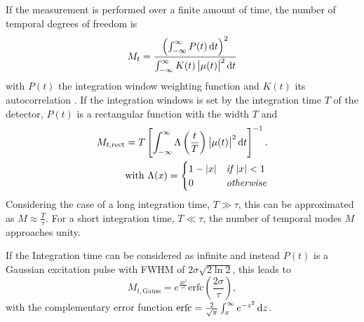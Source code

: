 If the measurement is performed over a finite amount of time, the number of temporal degrees of freedom is
\begin{equation}
M_t=\frac{\left(\int_{-\infty}^{\infty} P(t)\operatorname{\mathrm{d}\!} t\right)^2}{\int_{-\infty}^{\infty} K(t) \left|\mu(t)\right|^2\operatorname{\mathrm{d}\!} t}
\label{eq:modes}
\end{equation}
with $P(t)$ the integration window weighting function and $K(t)$ its autocorrelation \cite{goodman2007}. If the integration windows is set by the integration time $T$ of the detector, $P(t)$ is a rectangular function with the width $T$ and
\begin{align}
M_{t,\text{rect}} =T \left[\int_{-\infty}^{\infty} \Lambda\left(\frac{t}{T}\right) \left|\mu(t)\right|^2 \operatorname{\mathrm{d}\!} t \right]^{-1} .\\
\text{with  }\Lambda(x) = \begin{cases} 
 1-\left|x\right|& \textit{if }|x|<1\\
0 & \textit{otherwise}\\ 
\end{cases}
\label{eq:modesapprox}
\end{align}
Considering the case of a long integration time, $T\gg\tau$, this can be approximated as $M\approx\frac{T}{\tau}$. For a short integration time,  $T\ll\tau$, the number of temporal modes $M$ approaches unity.

If the Integration time can be considered as infinite and instead $P(t)$ is a Gaussian excitation pulse with FWHM of $2\sigma\sqrt{2\ln2}$, this leads to
\begin{equation}
	M_{t,\text{Gauss}}=e^{\frac{4 \sigma ^2}{\tau ^2}} \text{erfc}\left(\frac{2 \sigma }{\tau }\right),
	\label{eq:mgauss}
\end{equation}
with the complementary error function $\operatorname{erfc}=\frac{2}{\sqrt{\pi}}\int_x^\infty e^{-z^2}\operatorname{\mathrm{d}\!} z$.


